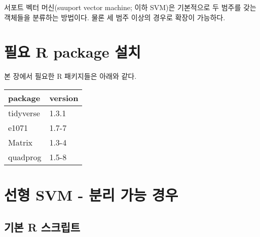 \documentclass[
]{book}
\begin{document}
서포트 벡터 머신(suuport vector machine; 이하 SVM)은 기본적으로 두 범주를 갖는 객체들을 분류하는 방법이다. 물론 세 범주 이상의 경우로 확장이 가능하다.

\hypertarget{svm-packages-install}{%
\section{필요 R package 설치}\label{svm-packages-install}}

본 장에서 필요한 R 패키지들은 아래와 같다.

\begin{tabular}{l|l}
\hline
package & version\\
\hline
tidyverse & 1.3.1\\
\hline
e1071 & 1.7-7\\
\hline
Matrix & 1.3-4\\
\hline
quadprog & 1.5-8\\
\hline
\end{tabular}

\hypertarget{linear-svm-separable}{%
\section{선형 SVM - 분리 가능 경우}\label{linear-svm-separable}}

\hypertarget{linear-svm-separable-basic-script}{%
\subsection{기본 R 스크립트}\label{linear-svm-separable-basic-script}}
\end{document}
